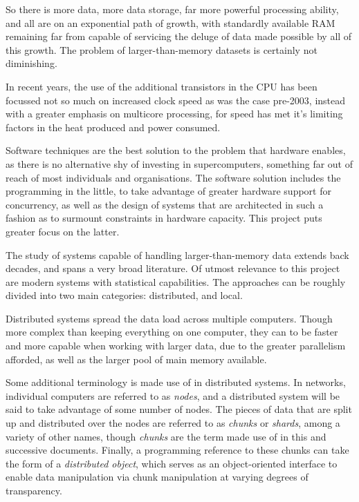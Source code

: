 So there is more data, more data storage, far more powerful processing ability, and all are on an exponential path of growth, with standardly available RAM remaining far from capable of servicing the deluge of data made possible by all of this growth\cite{sutter2005free}.
The problem of larger-than-memory datasets is certainly not diminishing.

In recent years, the use of the additional transistors in the CPU has been focussed not so much on increased clock speed as was the case pre-2003, instead with a greater emphasis on multicore processing, for speed has met it's limiting factors in the heat produced and power consumed\cite{sutter2005free}.

Software techniques are the best solution to the problem that hardware enables, as there is no alternative shy of investing in supercomputers, something far out of reach of most individuals and organisations.
The software solution includes the programming in the little, to take advantage of greater hardware support for concurrency, as well as the design of systems that are architected in such a fashion as to surmount constraints in hardware capacity.
This project puts greater focus on the latter.

The study of systems capable of handling larger-than-memory data extends back decades, and spans a very broad literature.
Of utmost relevance to this project are modern systems with statistical capabilities.
The approaches can be roughly divided into two main categories: distributed, and local.

Distributed systems spread the data load across multiple computers.
Though more complex than keeping everything on one computer, they can to be faster and more capable when working with larger data, due to the greater parallelism afforded, as well as the larger pool of main memory available\cite{foster1995parallel}.

Some additional terminology is made use of in distributed systems.
In networks, individual computers are referred to as \textit{nodes}, and a distributed system will be said to take advantage of some number of nodes\cite{kleppmann2017dataintensive}.
The pieces of data that are split up and distributed over the nodes are referred to as \textit{chunks} or \textit{shards}, among a variety of other names, though \textit{chunks} are the term made use of in this and successive documents.
Finally, a programming reference to these chunks can take the form of a \textit{distributed object}, which serves as an object-oriented interface to enable data manipulation via chunk manipulation at varying degrees of transparency\cite{emmerich2000engineering}.

